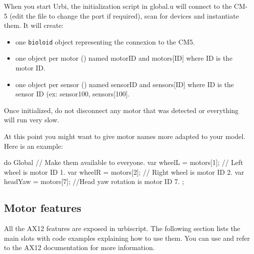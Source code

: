 When you start Urbi, the initialization script in global.u will connect to the
CM-5 (edit the file to change the port if required), scan for devices and
instantiate them. It will create:

\begin{itemize}
\item one \lstinline|bioloid| object representing the connexion to the CM5.
\item one object per motor () named motorID and motors[ID] where ID is the
motor ID.
\item one object per sensor () named sensorID and sensors[ID] where ID is
the sensor ID (ex: sensor100, sensors[100].
\end{itemize}

Once initialized, do not disconnect any motor that was detected or everything
will run very slow.

At this point you might want to give motor names more adapted to your model.
Here is an example:

\begin{urbiunchecked}
do Global{ // Make them available to everyone.
  var wheelL = motors[1]; // Left wheel is motor ID 1.
  var wheelR = motors[2]; // Right wheel is motor ID 2.
  var headYaw = motors[7]; //Head yaw rotation is motor ID 7.
  };
\end{urbiunchecked}


\subsection{Motor features}
\def\currentObject{AX12}
All the AX12 features are exposed in urbiscript. The following section lists the
main slots with code examples explaining how to use them. You can use
 and refer to the AX12 documentation for more
information.

